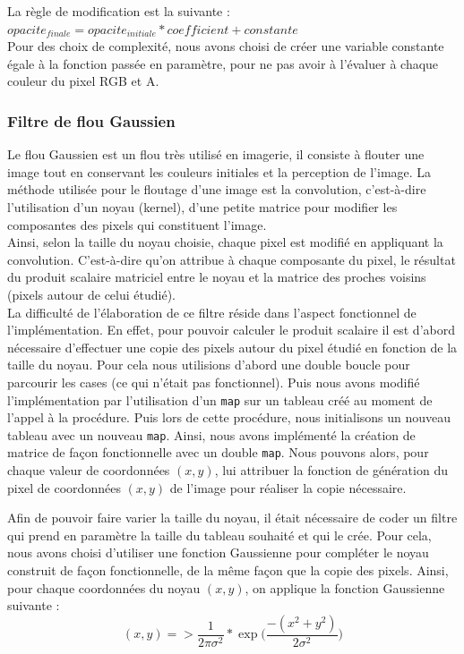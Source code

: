 \documentclass[11pt]{article}
\begin{document}
\noindent La règle de modification est la suivante :
$opacite_{finale} = opacite_{initiale} * coefficient + constante$ \\

Pour des choix de complexité, nous avons choisi de créer une variable constante égale à la fonction passée en paramètre, pour ne pas avoir à l'évaluer à chaque couleur du pixel RGB et A.

\subsubsection{Filtre de flou Gaussien}

Le flou Gaussien est un flou très utilisé en imagerie, il consiste à flouter une image tout en conservant les couleurs initiales et la perception de l'image. La méthode utilisée pour le floutage d'une image est la convolution, c'est-à-dire l'utilisation d'un noyau (kernel), d'une petite matrice pour modifier les composantes des pixels qui constituent l'image. \\ 

Ainsi, selon la taille du noyau choisie, chaque pixel est modifié en appliquant la convolution. C'est-à-dire qu'on attribue à chaque composante du pixel, le résultat du produit scalaire matriciel entre le noyau et la matrice des proches voisins (pixels autour de celui étudié). \\


La difficulté de l'élaboration de ce filtre réside dans l'aspect fonctionnel de l'implémentation. En effet, pour pouvoir calculer le produit scalaire il est d'abord nécessaire d'effectuer une copie des pixels autour du pixel étudié en fonction de la taille du noyau. Pour cela nous utilisions d'abord une double boucle pour parcourir les cases (ce qui n'était pas fonctionnel). Puis nous avons modifié l'implémentation par l'utilisation d'un \texttt{map} sur un tableau créé au moment de l'appel à la procédure. Puis lors de cette procédure, nous initialisons un nouveau tableau avec un nouveau \texttt{map}. Ainsi, nous avons implémenté la création de matrice de façon fonctionnelle avec un double \texttt{map}. Nous pouvons alors, pour chaque valeur de coordonnées $(x,y)$, lui attribuer la fonction de génération du pixel de coordonnées $(x,y)$ de l'image pour réaliser la copie nécessaire.

\noindent Afin de pouvoir faire varier la taille du noyau, il était nécessaire de coder un filtre qui prend en paramètre la taille du tableau souhaité et qui le crée. Pour cela, nous avons choisi d'utiliser une fonction Gaussienne pour compléter le noyau construit de façon fonctionnelle, de la même façon que la copie des pixels. Ainsi, pour chaque coordonnées du noyau $(x,y)$, on applique la fonction Gaussienne suivante :
$$(x,y) => \frac{1}{2\pi\sigma^2}*\exp{\Big(\frac{-(x^2+y^2)}{2\sigma^2}\Big)}$$
\end{document}
